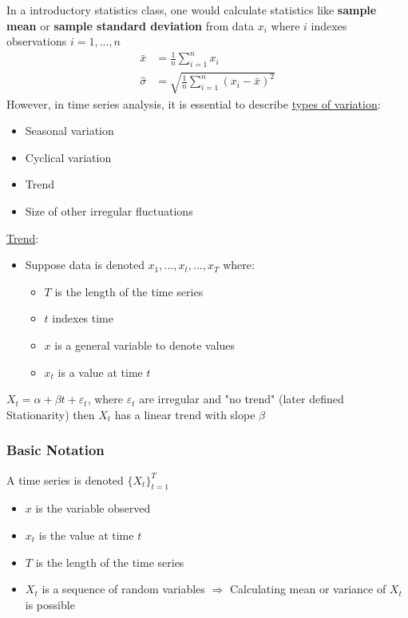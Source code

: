 In a introductory statistics class, one would calculate statistics like \textbf{sample mean} or \textbf{sample standard deviation} from data $x_i$ where $i$ indexes observations $i=1,...,n$ 
\begin{align*}
    \bar{x}&=\frac{1}{n}\sum_{i=1}^n x_i \\
    \hat{\sigma}&=\sqrt{\frac{1}{n}\sum_{i=1}^n (x_i - \bar{x})^2}
\end{align*}
However, in time series analysis, it is essential to describe \underline{types of variation}:
\begin{itemize}
    \item Seasonal variation
    \item Cyclical variation
    \item Trend
    \item Size of other irregular fluctuations
\end{itemize}

\bigskip
\underline{Trend}: 
\begin{itemize}
    \item[] Suppose data is denoted $x_1,...,x_t,...,x_T$ where:
    \begin{itemize}[label=\textbullet]
        \item $T$ is the length of the time series
        \item $t$ indexes time
        \item $x$ is a general variable to denote values
        \item $x_t$ is a value at time $t$
    \end{itemize}
\end{itemize}
$X_t = \alpha + \beta t + \varepsilon_t$, where $\varepsilon_t$ are irregular and "no trend" (later defined Stationarity) then $X_t$ has a linear trend with slope $\beta$ \\

\subsubsection{Basic Notation}

A time series is denoted $\{X_t\}_{t=1}^T$
\begin{itemize}
    \item $x$ is the variable observed
    \item $x_t$ is the value at time $t$
    \item $T$ is the length of the time series
    \item $X_t$ is a sequence of random variables $\Rightarrow$ Calculating mean or variance of $X_t$ is possible
\end{itemize}

